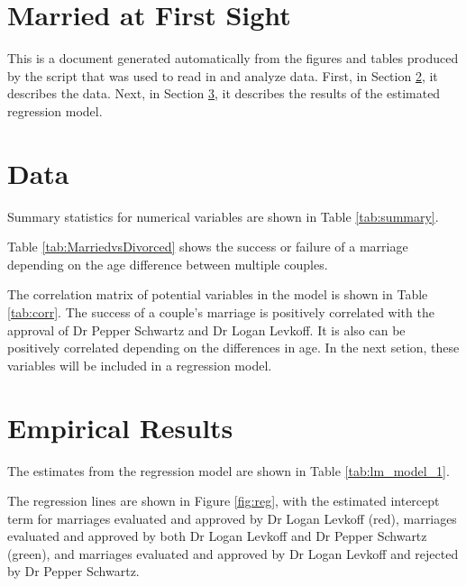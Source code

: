 \documentclass{paper}
\begin{document}

\section{Married at First Sight}

This is a document generated automatically from the figures and tables produced by
the script that was used to read in and analyze data.
First, in Section \ref{sec:data}, it describes the data.
Next, in Section \ref{sec:results}, it describes the results of the estimated regression model.

\section{Data} \label{sec:data}

Summary statistics for numerical variables are shown in Table \ref{tab:summary}.




Table \ref{tab:MarriedvsDivorced} shows the success or failure of a marriage depending on the age difference between multiple couples.



The correlation matrix of potential variables in the model is shown in Table \ref{tab:corr}.
The success of a couple's marriage is positively correlated with the approval of Dr Pepper Schwartz and Dr Logan Levkoff. It is also can be positively correlated depending on the differences in age. In the next setion, these variables will be included in a regression model.





\pagebreak
\section{Empirical Results}  \label{sec:results}


The estimates from the regression model are shown in Table \ref{tab:lm_model_1}.







\pagebreak
The regression lines are shown in Figure \ref{fig:reg}, with the estimated intercept term for marriages evaluated and approved by Dr Logan Levkoff (red), marriages evaluated and approved by both Dr Logan Levkoff and Dr Pepper Schwartz (green), and marriages evaluated and approved by Dr Logan Levkoff and rejected by Dr Pepper Schwartz.
\end{document}
